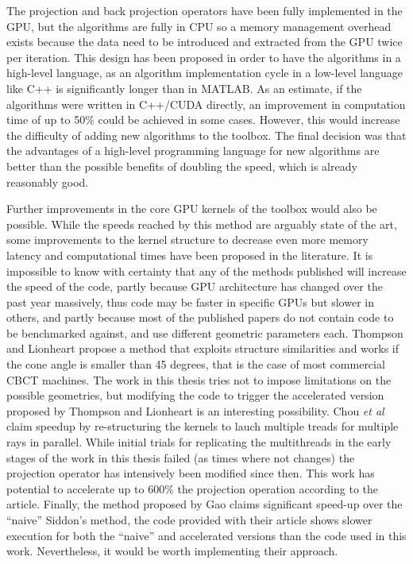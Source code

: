 The projection and back projection operators have been fully implemented in the GPU, but the algorithms are fully in CPU so a memory management overhead exists because the data need to be introduced and extracted from the GPU twice per iteration. This design has been proposed in order to have the algorithms in a high-level language, as an algorithm implementation cycle in a low-level language like C++ is significantly longer than in MATLAB. As an estimate, if the algorithms were written in C++/CUDA directly, an improvement in computation time of up to 50\% could be achieved in some cases. However, this would increase the difficulty of adding new algorithms to the toolbox. The final decision was that the advantages of a high-level programming language for new algorithms are better than the possible benefits of doubling the speed, which is already reasonably good. 

Further improvements in the core GPU kernels of the toolbox would also be possible. While the speeds reached by this method are arguably state of the art, some improvements to the kernel structure to decrease even more memory latency and computational times have been proposed in the literature. It is impossible to know with certainty that any of the methods published will increase the speed of the code, partly because GPU architecture has changed over the past year massively, thus code may be faster in specific GPUs but slower in others, and partly because most of the published papers do not contain code to be benchmarked against, and use different geometric parameters each. Thompson and Lionheart\cite{thompson2014gpu} propose a method that exploits structure similarities and works if the cone angle is smaller than 45 degrees, that is the case of most commercial CBCT machines. The work in this thesis tries not to impose limitations on the possible geometries, but modifying the code to trigger the accelerated version proposed by Thompson and Lionheart is an interesting possibility. Chou \emph{et al}\cite{chou2011fast} claim speedup by re-structuring the kernels to lauch multiple treads for multiple rays in parallel. While initial trials for replicating the multithreads in the early stages of the work in this thesis failed (as times where not changes) the projection operator has intensively been modified since then. This work has potential to accelerate up to 600\% the projection operation according to the article. Finally, the method proposed by Gao\cite{gao2012fast} claims significant speed-up over the ``naive'' Siddon's method, the code provided with their article shows slower execution for both the ``naive'' and accelerated versions than the code used in this work. Nevertheless, it would be worth implementing their approach.

